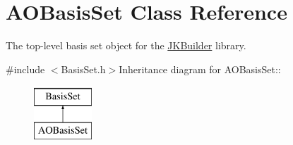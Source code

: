 \hypertarget{classJKBuilder_1_1AOBasisSet}{
\section{AOBasisSet Class Reference}
\label{classJKBuilder_1_1AOBasisSet}
}


The top-\/level basis set object for the \hyperlink{namespaceJKBuilder}{JKBuilder} library.  


{\ttfamily \#include $<$BasisSet.h$>$}Inheritance diagram for AOBasisSet::\begin{figure}[H]
\begin{center}
\leavevmode
\includegraphics[height=2cm]{classJKBuilder_1_1AOBasisSet}
\end{center}
\end{figure}
